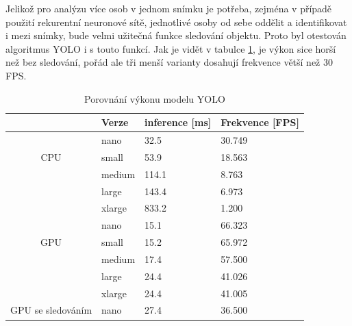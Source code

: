 Jelikož pro analýzu více osob v jednom snímku je potřeba, zejména v případě
použití rekurentní neuronové sítě, jednotlivé osoby od sebe oddělit a
identifikovat i mezi snímky, bude velmi užitečná funkce sledování objektu.
Proto byl otestován algoritmus YOLO i s touto funkcí. Jak je vidět v tabulce
\ref{tab:yolo_performance}, je výkon sice horší než bez sledování, pořád ale
tři menší varianty dosahují frekvence větší než $30$ FPS.

\begin{table}[htbp]
    \centering
    \caption{Porovnání výkonu modelu YOLO}
    \label{tab:yolo_performance}
    \begin{tabular}{|c|l|l|l|}
        \hline
                                           & \textbf{Verze} & \textbf{inference [ms]} & \textbf{Frekvence [FPS]} \\
        \hline\hline
        \multirow{3}{*}{CPU}               & nano           & 32.5                    & 30.749                   \\ \cline{2-4}
                                           & small          & 53.9                    & 18.563                   \\ \cline{2-4}
                                           & medium         & 114.1                   & 8.763                    \\ \cline{2-4}
                                           & large          & 143.4                   & 6.973                    \\ \cline{2-4}
                                           & xlarge         & 833.2                   & 1.200                    \\ \hline\hline
        \multirow{3}{*}{GPU}               & nano           & 15.1                    & 66.323                   \\ \cline{2-4}
                                           & small          & 15.2                    & 65.972                   \\ \cline{2-4}
                                           & medium         & 17.4                    & 57.500                   \\ \cline{2-4}
                                           & large          & 24.4                    & 41.026                   \\ \cline{2-4}
                                           & xlarge         & 24.4                    & 41.005                   \\ \hline\hline
        \multirow{3}{*}{GPU se sledováním} & nano           & 27.4                    & 36.500                   \\ \cline{2-4}

\end{tabular}
\end{table}
